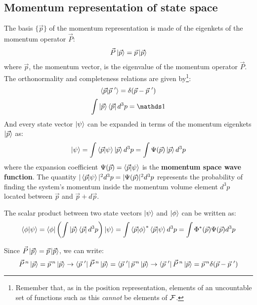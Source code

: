 \subsection{Momentum representation of state space}

The basis $\{\vec{p}\}$ of the momentum representation is made of the eigenkets of the momentum operator $\vec{P}$:
\begin{equation}
    \vec{P}\ket{\vec{p}} = \vec{p}\ket{\vec{p}}
\end{equation}
where $\vec{p}$, the momentum vector, is the eigenvalue of the momentum operator $\vec{P}$. The orthonormality and completeness relations are given by\footnote{Remember that, as in the position representation, elements of an uncountable set of functions such as this \textit{cannot} be elements of $\mathcal{F}$.}:
\begin{equation}
    \braket{\vec{p}|\vec{p}\ '} = \delta(\vec{p} - \vec{p}\ ')
\end{equation}
\begin{equation}
    \int \ket{\vec{p}}\bra{\vec{p}} d^3p = \Imat
\end{equation}
And every state vector $\ket{\psi}$ can be expanded in terms of the momentum eigenkets $\ket{\vec{p}}$ as:
\begin{equation}
    \ket{\psi} = \int \braket{\vec{p}|\psi} \ket{\vec{p}} d^3 p = \int \Psi(\vec{p}) \ket{\vec{p}} d^3 p
\end{equation}
where the expansion coefficient $\Psi(\vec{p}) = \braket{\vec{p}|\psi}$ is the \textbf{momentum space wave function}. The quantity $|\braket{\vec{p}|\psi}|^2d^3 p = |\Psi(\vec{p})|^2d^3p$ represents the probability of finding the system's momentum inside the momentum volume element $d^3p$ located between $\vec{p}$ and $\vec{p} + d\vec{p}$.

The scalar product between two state vectors $\ket{\psi}$ and $\ket{\phi}$ can be written as:
\begin{equation}
    \braket{\phi|\psi} = \bra{\phi}\left(\int \ket{\vec{p}}\bra{\vec{p}}d^3p\right)\ket{\psi} = \int \braket{\vec{p}|\phi}^*\braket{\vec{p}|\psi} d^3p = \int \Phi^*(\vec{p})\Psi(\vec{p}) d^3p
\end{equation}

Since $\vec{P}\ket{\vec{p}} = \vec{p}\ket{\vec{p}}$, we can write:
\begin{equation}
    \vec{P}^{\, n}\ket{\vec{p}} = \vec{p}\, ^n\ket{\vec{p}} \to \bra{\vec{p}\ '}\vec{P}^{\, n}\ket{\vec{p}} = \bra{\vec{p}\ '}\vec{p}\, ^n\ket{\vec{p}} \to \bra{\vec{p}\ '}\vec{P}^{\, n}\ket{\vec{p}} = \vec{p}\, ^n\delta(\vec{p} - \vec{p}\ ')
\end{equation}

